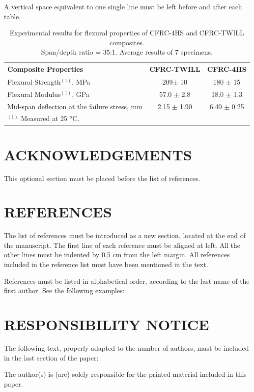 \documentclass[10pt,fleqn,a4paper,twoside]{article}
\begin{document}
A vertical space equivalent to one single line must be left before and after each table.

\begin{table}[!h]
\centering
\caption{Experimental results for flexural properties of CFRC-4HS and CFRC-TWILL composites. \protect\\Span/depth ratio = 35:1. Average results of 7 specimens.}
\label{Tab:1}
\begin{tabular}{l|c|c}
\hline
\textbf{Composite Properties} & \textbf{CFRC-TWILL} & \textbf{CFRC-4HS}\\
\hline
Flexural Strength\footnotesize{$^{(1)}$}, MPa & 209$\pm$ 10 & 180 $\pm$  15\\
Flexural Modulus\footnotesize{$^{(1)}$}, GPa & 57.0 $\pm$ 2.8 & 18.0 $\pm$  1.3\\
Mid-span deflection at the failure stress, mm & 2.15 $\pm$  1.90 & 6.40 $\pm$  0.25\\
\hline
\multicolumn{3}{l}{\footnotesize{$^{(1)}$ Measured at 25 $^{o}$C.}}
\end{tabular}
\end{table}

\section{ACKNOWLEDGEMENTS}
This optional section must be placed before the list of references.

\section{REFERENCES} 
\label{Sec:references}

The list of references must be introduced as a new section, located at the end of the manuscript. The first line of each reference must be aligned at left.  All the other lines must be indented by 0.5 cm from the left margin. All references included in the reference list must have been mentioned in the text.

References must be listed in alphabetical order, according to the last name of the first author. See the following examples:


\renewcommand{\refname}{}


\section{RESPONSIBILITY NOTICE}
The following text, properly adapted to the number of authors, must be included in the last section of the paper:

The author(s) is (are) solely responsible for the printed material included in this paper.
\end{document}

